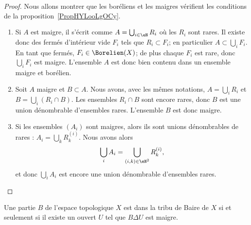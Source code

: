 \begin{proof}
	Nous allons montrer que les boréliens et les maigres vérifient les conditions de la proposition~\ref{PropHYLooLgOCy}.
	\begin{enumerate}
		\item
		      Si \( A\) est maigre, il s'écrit comme \( A=\bigcup_{i\in \eN}R_i\) où les \( R_i\) sont rares. Il existe donc des fermés d'intérieur vide \( F_i\) tels que \( R_i\subset F_i\); en particulier \( A\subset\bigcup_i F_i\). En tant que fermés, \( F_i\in\Borelien(X)\); de plus chaque \( F_i\) est rare, donc \( \bigcup_iF_i\) est maigre. L'ensemble \( A\) est donc bien contenu dans un ensemble maigre et borélien.
		\item
		      Soit \( A\) maigre et \( B\subset A\). Nous avons, avec les mêmes notations, \( A=\bigcup_iR_i\) et \( B=\bigcup_i(R_i\cap B)\). Les ensembles \( R_i\cap B\) sont encore rares, donc \( B\) est une union dénombrable d'ensembles rares. L'ensemble \( B\) est donc maigre.
		\item
		      Si les ensembles \( (A_i)\) sont maigres, alors ils sont unions dénombrables de rares : \( A_i=\bigcup_kR_k^{(i)}\). Nous avons alors
		      \begin{equation}
			      \bigcup_iA_i=\bigcup_{(i,k)\in \eN^2}R_k^{(i)},
		      \end{equation}
		      et donc \( \bigcup_iA_i\) est encore une union dénombrable d'ensembles rares.
	\end{enumerate}
\end{proof}

\begin{proposition}  \label{PropGRHootvAWq}
	Une partie \( B\) de l'espace topologique \( X\) est dans la tribu de Baire de \( X\) si et seulement si il existe un ouvert \( U\) tel que \( B\Delta U\) est maigre.
\end{proposition}

